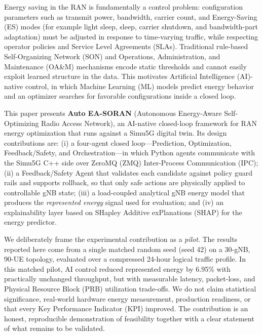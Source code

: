 \documentclass[conference]{IEEEtran}
\begin{document}
Energy saving in the RAN is fundamentally a control problem: configuration parameters such as transmit power, bandwidth, carrier count, and Energy-Saving (ES) modes (for example light sleep, sleep, carrier shutdown, and bandwidth-part adaptation) must be adjusted in response to time-varying traffic, while respecting operator policies and Service Level Agreements (SLAs). Traditional rule-based Self-Organizing Network (SON) and Operations, Administration, and Maintenance (OA\&M) mechanisms encode static thresholds and cannot easily exploit learned structure in the data. This motivates Artificial Intelligence (AI)-native control, in which Machine Learning (ML) models predict energy behavior and an optimizer searches for favorable configurations inside a closed loop.

This paper presents \textbf{Auto EA-SORAN} (Autonomous Energy-Aware Self-Optimizing Radio Access Network), an AI-native closed-loop framework for RAN energy optimization that runs against a Simu5G digital twin. Its design contributions are: (i) a four-agent closed loop---Prediction, Optimization, Feedback/Safety, and Orchestration---in which Python agents communicate with the Simu5G C++ side over ZeroMQ (ZMQ) Inter-Process Communication (IPC); (ii) a Feedback/Safety Agent that validates each candidate against policy guard rails and supports rollback, so that only safe actions are physically applied to controllable gNB state; (iii) a load-coupled analytical gNB energy model that produces the \emph{represented energy} signal used for evaluation; and (iv) an explainability layer based on SHapley Additive exPlanations (SHAP) for the energy predictor.

We deliberately frame the experimental contribution as a \emph{pilot}. The results reported here come from a single matched random seed (seed 42) on a 30-gNB, 90-UE topology, evaluated over a compressed 24-hour logical traffic profile. In this matched pilot, AI control reduced represented energy by 6.95\% with practically unchanged throughput, but with measurable latency, packet-loss, and Physical Resource Block (PRB) utilization trade-offs. We do not claim statistical significance, real-world hardware energy measurement, production readiness, or that every Key Performance Indicator (KPI) improved. The contribution is an honest, reproducible demonstration of feasibility together with a clear statement of what remains to be validated.

\end{document}
